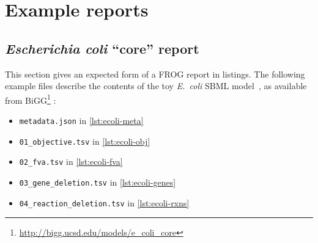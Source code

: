 \chapter{Example reports}

\section{\emph{Escherichia coli} ``core'' report}

This section gives an expected form of a FROG report in listings.
The following example files describe the contents of the toy \emph{E.~coli} SBML
model~\cite{orth2010reconstruction}, as available from
BiGG\footnote{\url{http://bigg.ucsd.edu/models/e_coli_core}} \cite{Norsigian2019}:
\begin{itemize}
\item \verb|metadata.json| in \cref{lst:ecoli-meta}
\item \verb|01_objective.tsv| in \cref{lst:ecoli-obj}
\item \verb|02_fva.tsv| in \cref{lst:ecoli-fva}
\item \verb|03_gene_deletion.tsv| in \cref{lst:ecoli-genes}
\item \verb|04_reaction_deletion.tsv| in \cref{lst:ecoli-rxns}
\end{itemize}

\begin{listing}

\caption[\emph{E.~coli} core metadata JSON]{FROG metadata file \texttt{metadata.json} in JSON format as generated from \texttt{e\_coli\_core.xml}. The file is available online at \url{\frogrepobase/data/ecoli/metadata.json}.}
\label{lst:ecoli-meta}
\end{listing}

\begin{listing}

\caption[\emph{E.~coli} core objective report]{FROG objective report \texttt{01\_objective.tsv} in TSV format as generated from \texttt{e\_coli\_core.xml}. The file is available online at \url{\frogrepobase/data/ecoli/01_objective.json}.}
\label{lst:ecoli-obj}
\end{listing}

\begin{sidewayslisting}

\caption[\emph{E.~coli} core variability report]{First 45 lines of a FROG flux variability report \texttt{02\_fva.tsv} in TSV format as generated from \texttt{e\_coli\_core.xml}. The file is available online at \url{\frogrepobase/data/ecoli/02_fva.json}.}
\label{lst:ecoli-fva}
\end{sidewayslisting}

